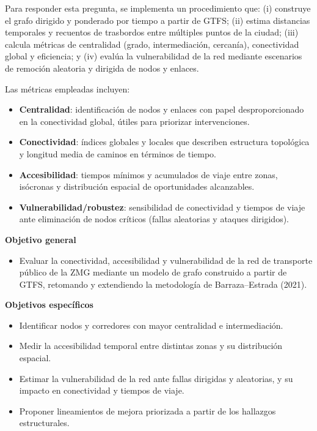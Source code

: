     Para responder esta pregunta, se implementa un procedimiento que: (i) construye el grafo dirigido y ponderado por tiempo a partir de GTFS; (ii) estima distancias temporales y recuentos de trasbordos entre múltiples puntos de la ciudad; (iii) calcula métricas de centralidad (grado, intermediación, cercanía), conectividad global y eficiencia; y (iv) evalúa la vulnerabilidad de la red mediante escenarios de remoción aleatoria y dirigida de nodos y enlaces.

    Las métricas empleadas incluyen:
    \begin{itemize}
      \item \textbf{Centralidad}: identificación de nodos y enlaces con papel desproporcionado en la conectividad global, útiles para priorizar intervenciones.
      \item \textbf{Conectividad}: índices globales y locales que describen estructura topológica y longitud media de caminos en términos de tiempo.
      \item \textbf{Accesibilidad}: tiempos mínimos y acumulados de viaje entre zonas, isócronas y distribución espacial de oportunidades alcanzables.
      \item \textbf{Vulnerabilidad/robustez}: sensibilidad de conectividad y tiempos de viaje ante eliminación de nodos críticos (fallas aleatorias y ataques dirigidos).
    \end{itemize}

    \textbf{Objetivo general}
    \begin{itemize}
      \item Evaluar la conectividad, accesibilidad y vulnerabilidad de la red de transporte público de la ZMG mediante un modelo de grafo construido a partir de GTFS, retomando y extendiendo la metodología de Barraza–Estrada (2021).
    \end{itemize}

    \textbf{Objetivos específicos}
    \begin{itemize}
      \item Identificar nodos y corredores con mayor centralidad e intermediación.
      \item Medir la accesibilidad temporal entre distintas zonas y su distribución espacial.
      \item Estimar la vulnerabilidad de la red ante fallas dirigidas y aleatorias, y su impacto en conectividad y tiempos de viaje.
      \item Proponer lineamientos de mejora priorizada a partir de los hallazgos estructurales.
    \end{itemize}


